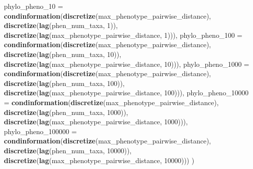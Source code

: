 \documentclass[]{book}
\newenvironment{Shaded}{\begin{snugshade}}{\end{snugshade}}
\newcommand{\DataTypeTok}[1]{\textcolor[rgb]{0.13,0.29,0.53}{#1}}
\newcommand{\DecValTok}[1]{\textcolor[rgb]{0.00,0.00,0.81}{#1}}
\newcommand{\KeywordTok}[1]{\textcolor[rgb]{0.13,0.29,0.53}{\textbf{#1}}}
\newcommand{\NormalTok}[1]{#1}
\begin{document}
\begin{Shaded}
\begin{Highlighting}[]
{  \DataTypeTok{phylo_pheno_10 =}     \KeywordTok{condinformation}\NormalTok{(}\KeywordTok{discretize}\NormalTok{(max_phenotype_pairwise_distance),}
                                       \KeywordTok{discretize}\NormalTok{(}\KeywordTok{lag}\NormalTok{(phen_num_taxa, }\DecValTok{1}\NormalTok{)),}
                                       \KeywordTok{discretize}\NormalTok{(}\KeywordTok{lag}\NormalTok{(max_phenotype_pairwise_distance, }\DecValTok{1}\NormalTok{))),}
  \DataTypeTok{phylo_pheno_100 =}    \KeywordTok{condinformation}\NormalTok{(}\KeywordTok{discretize}\NormalTok{(max_phenotype_pairwise_distance),}
                                       \KeywordTok{discretize}\NormalTok{(}\KeywordTok{lag}\NormalTok{(phen_num_taxa, }\DecValTok{10}\NormalTok{)),}
                                       \KeywordTok{discretize}\NormalTok{(}\KeywordTok{lag}\NormalTok{(max_phenotype_pairwise_distance, }\DecValTok{10}\NormalTok{))),}
  \DataTypeTok{phylo_pheno_1000 =}   \KeywordTok{condinformation}\NormalTok{(}\KeywordTok{discretize}\NormalTok{(max_phenotype_pairwise_distance),}
                                       \KeywordTok{discretize}\NormalTok{(}\KeywordTok{lag}\NormalTok{(phen_num_taxa, }\DecValTok{100}\NormalTok{)),}
                                       \KeywordTok{discretize}\NormalTok{(}\KeywordTok{lag}\NormalTok{(max_phenotype_pairwise_distance, }\DecValTok{100}\NormalTok{))),}
  \DataTypeTok{phylo_pheno_10000 =}  \KeywordTok{condinformation}\NormalTok{(}\KeywordTok{discretize}\NormalTok{(max_phenotype_pairwise_distance),}
                                       \KeywordTok{discretize}\NormalTok{(}\KeywordTok{lag}\NormalTok{(phen_num_taxa, }\DecValTok{1000}\NormalTok{)),}
                                       \KeywordTok{discretize}\NormalTok{(}\KeywordTok{lag}\NormalTok{(max_phenotype_pairwise_distance, }\DecValTok{1000}\NormalTok{))),}
  \DataTypeTok{phylo_pheno_100000 =} \KeywordTok{condinformation}\NormalTok{(}\KeywordTok{discretize}\NormalTok{(max_phenotype_pairwise_distance),}
                                       \KeywordTok{discretize}\NormalTok{(}\KeywordTok{lag}\NormalTok{(phen_num_taxa, }\DecValTok{10000}\NormalTok{)),}
                                       \KeywordTok{discretize}\NormalTok{(}\KeywordTok{lag}\NormalTok{(max_phenotype_pairwise_distance, }\DecValTok{10000}\NormalTok{)))}
\NormalTok{)}

}
\end{Highlighting}
\end{Shaded}
\end{document}
